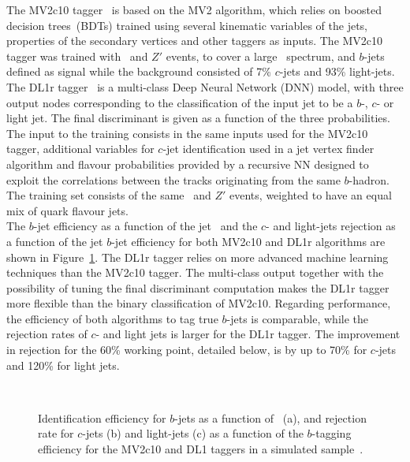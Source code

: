 The MV2c10 tagger~\cite{ATL-PHYS-PUB-2015-022} is based on the MV2 algorithm, which relies on boosted decision trees~(BDTs) trained using several kinematic variables of the jets, properties of the secondary vertices and other taggers as inputs. The MV2c10 tagger was trained with \ttbar\ and $Z'$ events, to cover a large \pT\ spectrum, and $b$-jets defined as signal while the background consisted of 7\% $c$-jets and 93\% light-jets.\\

The DL1r tagger~\cite{taggingeff} is a multi-class Deep Neural Network (DNN) model, with three output nodes corresponding to the classification of the input jet to be a $b$-, $c$- or light jet. The final discriminant is given as a function of the three probabilities. The input to the training consists in the same inputs used for the MV2c10 tagger, additional variables for $c$-jet identification used in a jet vertex finder algorithm and flavour probabilities provided by a recursive NN designed to exploit the correlations between the tracks originating from the same $b$-hadron. The training set consists of the same \ttbar\ and $Z'$ events, weighted to have an equal mix of quark flavour jets.\\

The $b$-jet efficiency as a function of the jet \pT\ and the $c$- and light-jets rejection as a function of the jet $b$-jet efficiency for both MV2c10 and DL1r algorithms are shown in Figure~\ref{figEVNTRECO:taggingeff}. The DL1r tagger relies on more advanced machine learning techniques than the MV2c10 tagger. The multi-class output together with the possibility of tuning the final discriminant computation makes the DL1r tagger more flexible than the binary classification of MV2c10. Regarding performance, the efficiency of both algorithms to tag true $b$-jets is comparable, while the rejection rates of $c$- and light jets is larger for the DL1r tagger. The improvement in rejection for the 60\% working point, detailed below, is by up to 70\% for $c$-jets and 120\% for light jets.

\begin{figure}[htbp]
    \RawFloats
    \begin{center}
         \\
        \quad
        \caption{
        Identification efficiency for $b$-jets as a function of \pT\ (a), and rejection rate for $c$-jets (b) and light-jets (c) as a function of the $b$-tagging efficiency for the MV2c10 and DL1 taggers in a simulated \ttbar sample~\cite{taggingeff}.
    }
    \label{figEVNTRECO:taggingeff}
    \end{center}
\end{figure}

